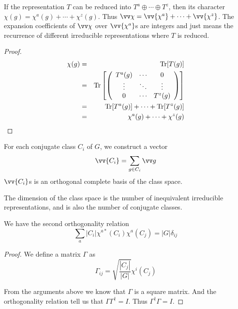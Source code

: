 \documentclass[12pt]{book}
\begin{document}
	\begin{lemma}
		If the representation $T$ can be reduced into $T^a\oplus\cdots\oplus T^z$, then its character $\chi(g)=\chi^a(g)+\cdots+\chi^z(g)$. Thus $\vv\chi=\vv{\chi^a}+\cdots+\vv{\chi^z}$. The expansion coefficients of $\vv\chi$ over $\vv{\chi^a}$s are integers and just means the recurrence of different irreducible representations where $T$ is reduced.
	\end{lemma}
	\begin{proof}
	\begin{eqnarray}
		\chi(g)&=&{\rm Tr}[T(g)]\\
		&=&{\rm Tr}\left[\left(\begin{array}{ccc}
			T^a(g)&\cdots&0\\
			\vdots&\ddots&\vdots\\
			0&\cdots&T^z(g)
		\end{array}	\right)\right]\\
		&=&{\rm Tr}[T^a(g)]+\cdots+{\rm Tr}[T^z(g)]\\
		&=&\chi^a(g)+\cdots+\chi^z(g)
	\end{eqnarray}
	\end{proof}
	
	\begin{lemma}
		
	For each conjugate class $C_i$ of $G$, we construct a vector
	\begin{equation}
		\vv{C_i}=\sum_{g\in C_i}\vv g
	\end{equation}	
	 $\vv{C_i}$s is an orthogonal complete basis of the class space.
	 \end{lemma}
	
	\begin{corollary}
		The dimension of the class space is the number of inequivalent irreducible representations, and is also the number of conjugate classes.
	\end{corollary}
	
	\begin{lemma}
		We have the second orthogonality relation
	\begin{equation}
		\sum_a|C_i|\chi^{a*}(C_i)\chi^a(C_j)=|G|\delta_{ij}\label{eqn:2nd-ortho}
	\end{equation}
	\end{lemma}
	\begin{proof}
	We define a matrix $\Gamma$ as 
	\begin{equation}
		\Gamma_{ij}=\sqrt{\frac{|C_j|}{|G|}}\chi^i(C_j)
	\end{equation}
	
	From the arguments above we know that $\Gamma$ is a square matrix. And the orthogonality relation tell us that $\Gamma\Gamma^\dagger=I$. Thus $\Gamma^\dagger\Gamma=I$.
	\end{proof}
	
\end{document}
